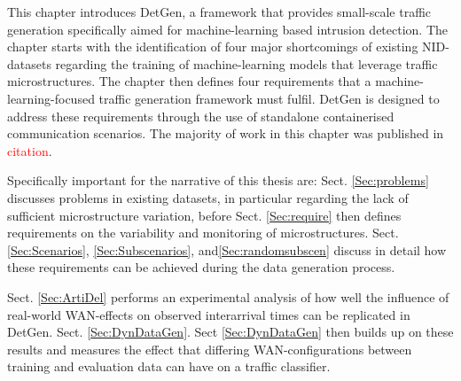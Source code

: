 
This chapter introduces DetGen, a framework that provides small-scale traffic generation specifically aimed for machine-learning based intrusion detection. The chapter starts with the identification of four major shortcomings of existing NID-datasets regarding the training of machine-learning models that leverage traffic microstructures. The chapter then defines four requirements that a machine-learning-focused traffic generation framework must fulfil. DetGen is designed to address these requirements through the use of standalone containerised communication scenarios. The majority of work in this chapter was published in \textcolor{red}{citation}.


Specifically important for the narrative of this thesis are:
Sect. \ref{Sec:problems} discusses problems in existing datasets, in particular regarding the lack of sufficient microstructure variation, before Sect. \ref{Sec:require} then defines requirements on the variability and monitoring of microstructures. Sect. \ref{Sec:Scenarios}, \ref{Sec:Subscenarios}, and\ref{Sec:randomsubscen} discuss in detail how these requirements can be achieved during the data generation process.

Sect. \ref{Sec:ArtiDel} performs an experimental analysis of how well the influence of real-world WAN-effects on observed interarrival times can be replicated in DetGen. Sect. \ref{Sec:DynDataGen}. Sect \ref{Sec:DynDataGen} then builds up on these results and measures the effect that differing WAN-configurations between training and evaluation data can have on a traffic classifier. 




%


